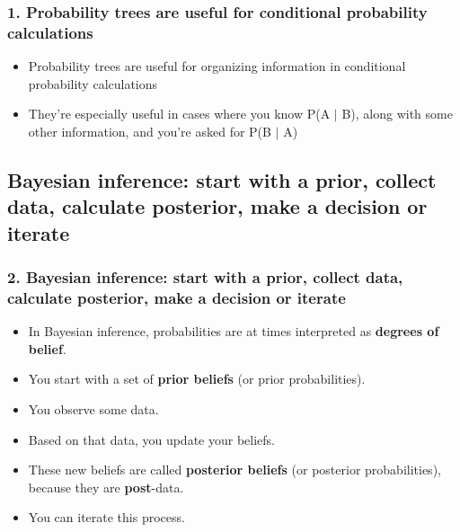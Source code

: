 \documentclass[slidestop,compress,mathserif,12pt,t,professionalfonts,xcolor=table]{beamer}
\begin{document}

\begin{frame}
\frametitle{1. Probability trees are useful for conditional probability calculations}

\begin{itemize}

\item Probability trees are useful for organizing information in conditional probability calculations

\item They're especially useful in cases where you know P(A $|$ B), along with some other information, and you're asked for P(B $|$ A)

\end{itemize}

\end{frame}


\subsection{Bayesian inference: start with a prior, collect data, calculate posterior, make a decision or iterate}
\label{mi2}


\begin{frame}
\frametitle{2. Bayesian inference: start with a prior, collect data, calculate posterior, make a decision or iterate}

\begin{itemize}[<+->]

\item In Bayesian inference, probabilities are at times interpreted as \textbf{degrees of belief}.

\item You start with a set of \textbf{prior beliefs} (or prior probabilities).

\item You observe some data.

\item Based on that data, you update your beliefs.  

\item These new beliefs are called \textbf{posterior beliefs} (or posterior probabilities), because they are \textbf{post}-data.

\item You can iterate this process.

\end{itemize}

\end{frame}
\end{document}
